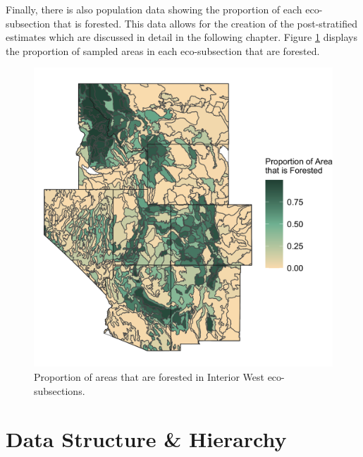 \documentclass[12pt,twoside]{reedthesis}
\begin{document}
Finally, there is also population data showing the proportion of each eco-subsection that is forested. This data allows for the creation of the post-stratified estimates which are discussed in detail in the following chapter. Figure \ref{fig:strata-plot} displays the proportion of sampled areas in each eco-subsection that are forested.
\begin{figure}

{\centering \includegraphics[width=0.65\linewidth]{figure/strata_plot} 

}

\caption[Proportion of areas that are forested in Interior West eco-subsections]{Proportion of areas that are forested in Interior West eco-subsections.}\label{fig:strata-plot}
\end{figure}
\clearpage

\hypertarget{data-structure-hierarchy}{%
\section{Data Structure \& Hierarchy}\label{data-structure-hierarchy}}
\end{document}
